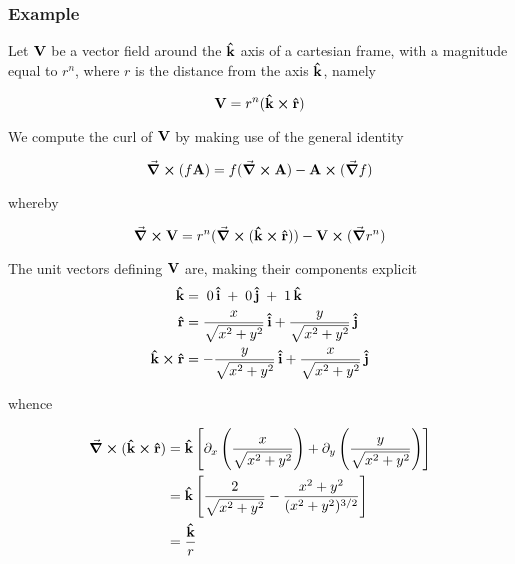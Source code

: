 \subsubsection*{Example}
Let $\vb{V}$ be a vector field  around the $\vu{k}$ axis of a cartesian frame, with a magnitude equal to $r^n$, where $r$ is the distance from the axis $\vu{k}$, namely

\begin{equation}
\vb{V} = r^n (\vu{k} \cross \vu{r})
\label{eq:curl_example_field}
\end{equation}  

We compute the curl of $\vb{V}$ by making use of the general identity

\begin{equation}
\curl{(f \vb{A})} = f (\curl{\vb{A}}) - \vb{A} \cross (\grad{f})
\label{eq:product_curl}
\end{equation} 

whereby 

\begin{equation*}
\curl{\vb{V}} = r^n (\curl{(\vu{k} \cross \vu{r})}) - \vb{V} \cross (\grad{r^n})
\end{equation*}

The unit vectors defining $\vb{V}$ are, making their components explicit    
\begin{align*}
\vu{k} &= \;0\, \vu{i}\; + \;0\, \vu{j}\; + \;1\, \vu{k}		\\ 
\vu{r} &= \frac{x }{\sqrt{x^2 + y^2}}\, \vu{i} + \frac{y}{\sqrt{x^2 + y^2}}\, \vu{j} \\
\vu{k} \cross \vu{r} &= -\frac{y}{\sqrt{x^2 + y^2}}\, \vu{i} + \frac{x}{\sqrt{x^2 + y^2}}\, \vu{j}
\end{align*} 

whence 

\begin{equation}
\begin{aligned}
\curl{(\vu{k} \cross \vu{r})} &= \vu{k} \left[ \partial_x \left( \frac{x}{\sqrt{x^2 + y^2}} \right) 
                                            +  \partial_y \left( \frac{y}{\sqrt{x^2 + y^2}} \right) \right] \\
                              &= \vu{k} \left[ \frac{2}{\sqrt{x^2 + y^2}} - \frac{x^2 + y^2}{(x^2 + y^2)^{3/2}} \right] \\
                              &= \frac{\vu{k}}{r}
\end{aligned} 
\end{equation}


